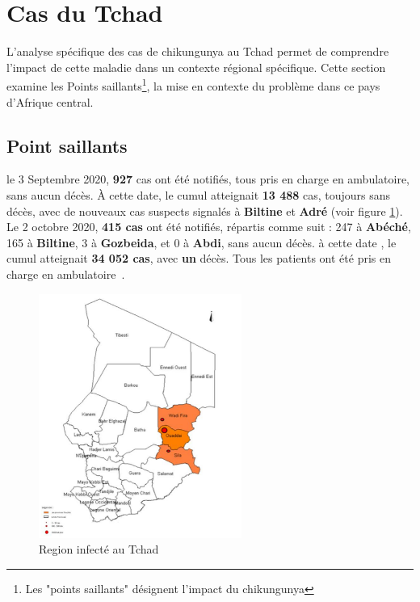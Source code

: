 \section{Cas du Tchad}

L'analyse spécifique des cas de chikungunya au Tchad permet de comprendre l'impact de cette maladie dans un contexte régional spécifique. Cette section examine les Points saillants\footnote{Les "points saillants" désignent l'impact du chikungunya}, la mise en contexte du problème dans ce pays d'Afrique central.


\subsection{Point saillants}
le 3 Septembre 2020, \textbf{927} cas ont été notifiés, tous pris en charge en ambulatoire, sans aucun décès. À cette date, le cumul atteignait\textbf{ 13 488} cas, toujours sans décès, avec de nouveaux cas suspects signalés à \textbf{Biltine} et \textbf{Adré} (voir figure \ref{fig:chikvintchadmap}). Le 2 octobre 2020, \textbf{415 cas} ont été notifiés, répartis comme suit : 247 à \textbf{Abéché}, 165 à \textbf{Biltine}, 3 à \textbf{Gozbeida}, et 0 à \textbf{Abdi}, sans aucun décès. à cette date , le cumul atteignait \textbf{34 052 cas}, avec \textbf{un} décès. Tous les patients ont été pris en charge en ambulatoire~\cite{rapport2020oms}.

\begin{figure}[!h]
	\begin{center}
		\includegraphics[height=8cm]{images/chadmap}
	\end{center}
	\caption{Region infecté au Tchad~\cite{rapport2020oms}}
	\label{fig:chikvintchadmap}
\end{figure}


